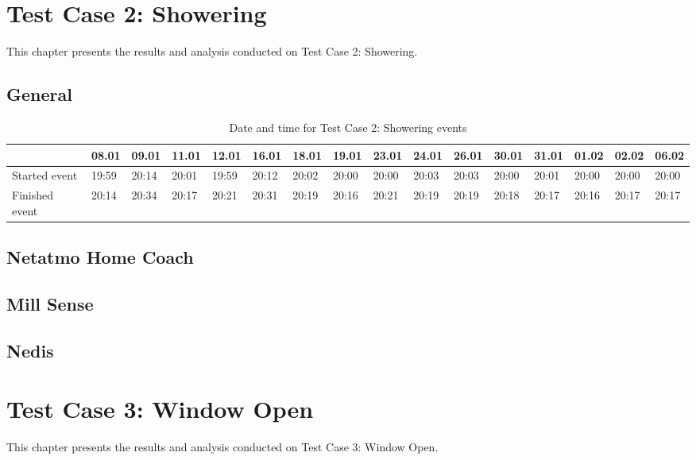 \section{Test Case 2: Showering}
This chapter presents the results and analysis conducted on Test Case 2: Showering. 
\subsection{General}
\begin{table}[!hbtp]
    \centering
    \begin{adjustbox}{width=1\textwidth} 
        \begin{tabular}{l|l|l|l|l|l|l|l|l|l|l|l|l|l|l|l|}
            \cline{2-16}
                & 08.01 & 09.01 & 11.01 & 12.01 & 16.01 & 18.01 & 19.01 & 23.01 & 24.01 & 26.01 & 30.01 & 31.01 & 01.02 & 02.02 & 06.02 \\ \hline
            \multicolumn{1}{|l|}{Started event}  & 19:59 & 20:14 & 20:01 & 19:59 & 20:12 & 20:02 & 20:00 & 20:00 & 20:03 & 20:03 & 20:00 & 20:01 & 20:00 & 20:00 & 20:00 \\ \hline
            \multicolumn{1}{|l|}{Finished event} & 20:14 & 20:34 & 20:17 & 20:21 & 20:31 & 20:19 & 20:16 & 20:21 & 20:19 & 20:19 & 20:18 & 20:17 & 20:16 & 20:17 & 20:17 \\ \hline
        \end{tabular}
    \end{adjustbox}
    \caption{Date and time for Test Case 2: Showering events}
    \label{tab:ShoweringDates}
\end{table}

\subsection{Netatmo Home Coach}
\subsection{Mill Sense}
\subsection{Nedis}

\section{Test Case 3: Window Open}
This chapter presents the results and analysis conducted on Test Case 3: Window Open. 
